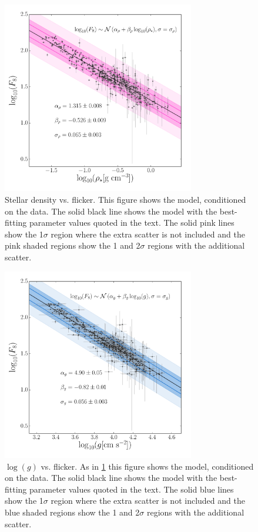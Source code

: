 \documentclass[apjl]{emulateapj}
\begin{document}
\begin{figure}
\begin{center}
\includegraphics[width=8.4cm,angle=0,clip=true]{flicker_vs_rho.pdf}
\caption{
Stellar density vs. flicker.
This figure shows the model, conditioned on the data.
The solid black line shows the model with the best-fitting parameter values
quoted in the text.
The solid pink lines show the 1$\sigma$ region where the extra scatter is not
included and the pink shaded regions show the 1 and 2$\sigma$ regions with the
additional scatter.}
\label{fig:rhostar}
\end{center}
\end{figure}

\begin{figure}
\begin{center}
\includegraphics[width=8.4cm,angle=0,clip=true]{flicker_vs_logg.pdf}
\caption{
$\log(g)$ vs. flicker.
As in \ref{fig:rhostar} this figure shows the model, conditioned on the data.
The solid black line shows the model with the best-fitting parameter values
quoted in the text.
The solid blue lines show the 1$\sigma$ region where the extra scatter is not
included and the blue shaded regions show the 1 and 2$\sigma$ regions with the
additional scatter.}
\label{fig:logg}
\end{center}
\end{figure}
\end{document}
